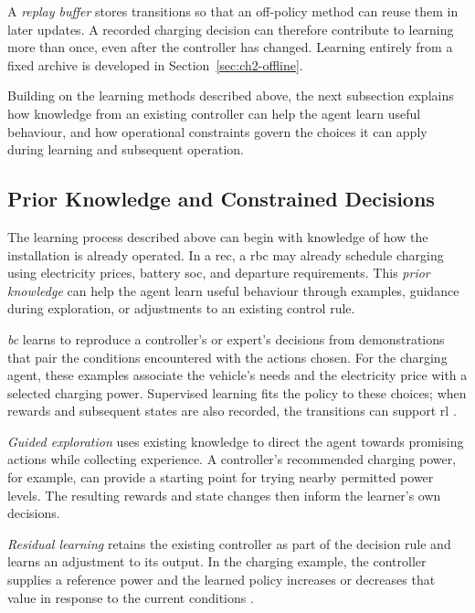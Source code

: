 A \emph{replay buffer} stores transitions so that an off-policy method can reuse them in later updates. A recorded charging decision can therefore contribute to learning more than once, even after the controller has changed. Learning entirely from a fixed archive is developed in Section~\ref{sec:ch2-offline}.

Building on the learning methods described above, the next subsection explains how knowledge from an existing controller can help the agent learn useful behaviour, and how operational constraints govern the choices it can apply during learning and subsequent operation.

\subsection{Prior Knowledge and Constrained Decisions}
\label{sec:ch2-constrained-foundations}

The learning process described above can begin with knowledge of how the installation is already operated. In a \gls{rec}, a \gls{rbc} may already schedule charging using electricity prices, battery \gls{soc}, and departure requirements. This \emph{prior knowledge} can help the agent learn useful behaviour through examples, guidance during exploration, or adjustments to an existing control rule.

\emph{\gls{bc}} learns to reproduce a controller's or expert's decisions from demonstrations that pair the conditions encountered with the actions chosen. For the charging agent, these examples associate the vehicle's needs and the electricity price with a selected charging power. Supervised learning fits the policy to these choices; when rewards and subsequent states are also recorded, the transitions can support \gls{rl} \parencite{ross2011dagger}.

\emph{Guided exploration} uses existing knowledge to direct the agent towards promising actions while collecting experience. A controller's recommended charging power, for example, can provide a starting point for trying nearby permitted power levels. The resulting rewards and state changes then inform the learner's own decisions.

\emph{Residual learning} retains the existing controller as part of the decision rule and learns an adjustment to its output. In the charging example, the controller supplies a reference power and the learned policy increases or decreases that value in response to the current conditions \parencite{johannink2019residual}.

